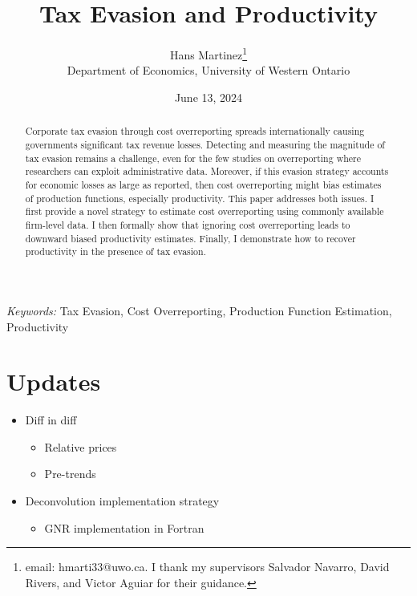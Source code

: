 \documentclass[
  12pt]{article}
\providecommand{\tightlist}{%
  \setlength{\itemsep}{0pt}\setlength{\parskip}{0pt}}\usepackage{longtable,booktabs,array}
\theoremstyle{definition}
\theoremstyle{remark}
\begin{document}
\def\spacingset#1{\renewcommand{\baselinestretch}%
{#1}\small\normalsize} \spacingset{1}



\date{June 13, 2024}
\title{\bf Tax Evasion and Productivity}
\author{
Hans Martinez\thanks{email: hmarti33@uwo.ca. I thank my supervisors
Salvador Navarro, David Rivers, and Victor Aguiar for their guidance.}\\
Department of Economics, University of Western Ontario\\
}
\maketitle

\bigskip
\bigskip
\begin{abstract}
Corporate tax evasion through cost overreporting spreads internationally
causing governments significant tax revenue losses. Detecting and
measuring the magnitude of tax evasion remains a challenge, even for the
few studies on overreporting where researchers can exploit
administrative data. Moreover, if this evasion strategy accounts for
economic losses as large as reported, then cost overreporting might bias
estimates of production functions, especially productivity. This paper
addresses both issues. I first provide a novel strategy to estimate cost
overreporting using commonly available firm-level data. I then formally
show that ignoring cost overreporting leads to downward biased
productivity estimates. Finally, I demonstrate how to recover
productivity in the presence of tax evasion.
\end{abstract}

\noindent%
{\it Keywords:} Tax Evasion, Cost Overreporting, Production Function
Estimation, Productivity
\vfill

\newpage
\spacingset{1.9} %

\section*{Updates}\label{updates}

\begin{itemize}
\tightlist
\item
  Diff in diff

  \begin{itemize}
  \tightlist
  \item
    Relative prices
  \item
    Pre-trends
  \end{itemize}
\item
  Deconvolution implementation strategy

  \begin{itemize}
  \tightlist
  \item
    GNR implementation in Fortran
  \end{itemize}
\end{itemize}
\end{document}
